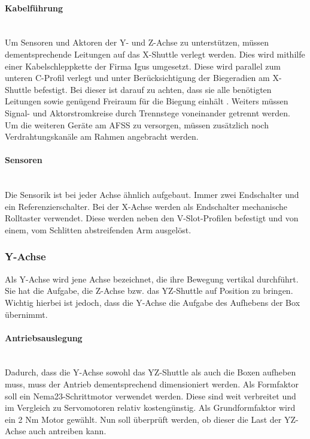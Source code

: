 \paragraph{Kabelführung} \mbox{}\\
Um Sensoren und Aktoren der Y- und Z-Achse zu unterstützen, müssen dementsprechende Leitungen auf das X-Shuttle verlegt werden. Dies wird mithilfe einer Kabelschleppkette der Firma Igus umgesetzt. Diese wird parallel zum unteren C-Profil verlegt und unter Berücksichtigung der Biegeradien am X-Shuttle befestigt. Bei dieser ist darauf zu achten, dass sie alle benötigten Leitungen sowie genügend Freiraum für die Biegung einhält \cite{igus_freitragend}. Weiters müssen Signal- und Aktorstromkreise durch Trennstege voneinander getrennt werden.
\\
Um die weiteren Geräte am AFSS zu versorgen, müssen zusätzlich noch Verdrahtungskanäle am Rahmen angebracht werden.

\paragraph{Sensoren}\mbox{}\\
Die Sensorik ist bei jeder Achse ähnlich aufgebaut. Immer zwei Endschalter und ein Referenzierschalter. Bei der X-Achse werden als Endschalter mechanische Rolltaster verwendet. Diese werden neben den V-Slot-Profilen befestigt und von einem, vom Schlitten abstreifenden Arm ausgelöst.

\subsubsection{Y-Achse}
Als Y-Achse wird jene Achse bezeichnet, die ihre Bewegung vertikal durchführt. Sie hat die Aufgabe, die Z-Achse bzw. das YZ-Shuttle auf Position zu bringen. Wichtig hierbei ist jedoch, dass die Y-Achse die Aufgabe des Aufhebens der Box übernimmt.

\paragraph{Antriebsauslegung}\mbox{}\\
Dadurch, dass die Y-Achse sowohl das YZ-Shuttle als auch die Boxen aufheben muss, muss der Antrieb dementsprechend dimensioniert werden. Als Formfaktor soll ein Nema23-Schrittmotor verwendet werden. Diese sind weit verbreitet und im Vergleich zu Servomotoren relativ kostengünstig. Als Grundformfaktor wird ein 2 Nm Motor gewählt. Nun soll überprüft werden, ob dieser die Last der YZ-Achse auch antreiben kann.


